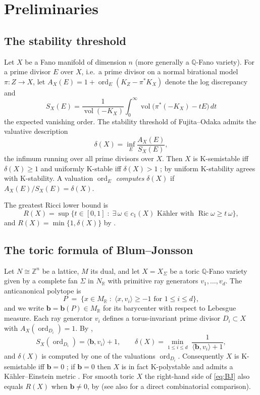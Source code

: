 \documentclass[11pt]{amsart}
\theoremstyle{definition}
\theoremstyle{remark}
\newcommand{\RR}{\mathbb{R}}
\newcommand{\ZZ}{\mathbb{Z}}
\newcommand{\QQ}{\mathbb{Q}}
\newcommand{\vol}{\operatorname{vol}}
\newcommand{\ord}{\operatorname{ord}}
\begin{document}
\section{Preliminaries}\label{sec:prelim}

\subsection{The stability threshold}
Let $X$ be a Fano manifold of dimension $n$ (more generally a $\QQ$-Fano
variety). For a prime divisor $E$ over $X$, i.e.\ a prime divisor on a
normal birational model $\pi\colon Z\to X$, let
$A_X(E)=1+\ord_E(K_Z-\pi^*K_X)$ denote the log discrepancy and
\[
S_X(E)=\frac{1}{\vol(-K_X)}\int_0^\infty
\vol\bigl(\pi^*(-K_X)-tE\bigr)\,dt
\]
the expected vanishing order. The stability threshold of Fujita--Odaka
\cite{FO18} admits the valuative description \cite{BJ20}
\[
\delta(X)=\inf_{E}\frac{A_X(E)}{S_X(E)},
\]
the infimum running over all prime divisors over $X$. Then $X$ is
K-semistable iff $\delta(X)\ge1$ and uniformly K-stable iff
$\delta(X)>1$ \cite{FO18,BJ20}; by \cite{LXZ22} uniform K-stability
agrees with K-stability. A valuation $\ord_E$ \emph{computes}
$\delta(X)$ if $A_X(E)/S_X(E)=\delta(X)$.

The greatest Ricci lower bound \cite{Tian92,Szekelyhidi11} is
\[
R(X)=\sup\bigl\{t\in[0,1]\;:\;\exists\,
\omega\in c_1(X)\text{ K\"ahler with }\operatorname{Ric}\omega\ge
t\,\omega\bigr\},
\]
and $R(X)=\min\{1,\delta(X)\}$ by \cite{BBJ21,CRZ19}.

\subsection{The toric formula of Blum--Jonsson}\label{subsec:BJ}
Let $N\cong\ZZ^n$ be a lattice, $M$ its dual, and let $X=X_\Sigma$ be a
toric $\QQ$-Fano variety given by a complete fan $\Sigma$ in
$N_\RR$ with primitive ray generators $v_1,\dots,v_d$. The
anticanonical polytope is
\[
P\;=\;\bigl\{x\in M_\RR\;:\;\langle x,v_i\rangle\ge-1
\text{ for }1\le i\le d\bigr\},
\]
and we write $\mathbf b=\mathbf b(P)\in M_\RR$ for its barycenter with
respect to Lebesgue measure. Each ray generator $v_i$ defines a
torus-invariant prime divisor $D_i\subset X$ with $A_X(\ord_{D_i})=1$.
By \cite[Corollary 7.7 and \S7.6]{BJ20},
\begin{equation}\label{eq:BJ}
S_X(\ord_{D_i})=\langle\mathbf b,v_i\rangle+1,
\qquad
\delta(X)=\min_{1\le i\le d}\;
\frac{1}{\langle\mathbf b,v_i\rangle+1},
\end{equation}
and $\delta(X)$ is computed by one of the valuations
$\ord_{D_i}$. Consequently $X$ is K-semistable iff $\mathbf b=0$
\cite{WZ04,BB13,Berman16,BJ20}; if $\mathbf b=0$ then $X$ is in fact
K-polystable and admits a K\"ahler--Einstein metric \cite{WZ04}. For
smooth toric $X$ the right-hand side of \eqref{eq:BJ} also equals
$R(X)$ when $\mathbf b \neq 0$, by \cite{Li11} (see also
\cite{Yotsutani22} for a direct combinatorial comparison).
\end{document}

